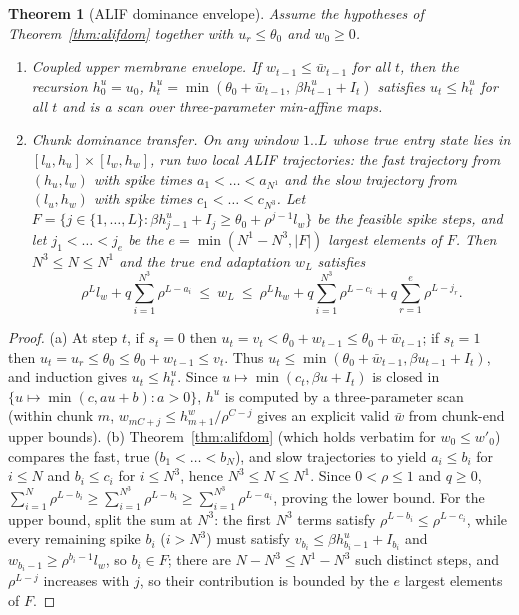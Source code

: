 \documentclass[10pt]{article}
\newtheorem{theorem}{Theorem}
\theoremstyle{remark}
\begin{document}
\begin{theorem}[ALIF dominance envelope]
\label{thm:alifenv}
Assume the hypotheses of Theorem~\ref{thm:alifdom} together with $u_r\le\theta_0$ and $w_0\ge0$.
\begin{enumerate}[label=(\alph*),leftmargin=*]
\item \emph{Coupled upper membrane envelope.} If $w_{t-1}\le \bar w_{t-1}$ for all $t$, then the recursion $h_0^u=u_0$, $h_t^u=\min(\theta_0+\bar w_{t-1},\ \beta h_{t-1}^u+I_t)$ satisfies $u_t\le h_t^u$ for all $t$ and is a scan over three-parameter min-affine maps.
\item \emph{Chunk dominance transfer.} On any window $1..L$ whose true entry state lies in $[l_u,h_u]\times[l_w,h_w]$, run two local ALIF trajectories: the \emph{fast} trajectory from $(h_u,l_w)$ with spike times $a_1<\dots<a_{N^1}$ and the \emph{slow} trajectory from $(l_u,h_w)$ with spike times $c_1<\dots<c_{N^3}$. Let $F=\{j\in\{1,\dots,L\}:\beta h_{j-1}^u+I_j\ge\theta_0+\rho^{j-1}l_w\}$ be the feasible spike steps, and let $j_1<\dots<j_e$ be the $e=\min(N^1-N^3,|F|)$ largest elements of $F$. Then $N^3\le N\le N^1$ and the true end adaptation $w_L$ satisfies
\[\rho^Ll_w+q\sum_{i=1}^{N^3}\rho^{L-a_i}\ \le\ w_L\ \le\ \rho^Lh_w+q\sum_{i=1}^{N^3}\rho^{L-c_i}+q\sum_{r=1}^{e}\rho^{L-j_r}.\]
\end{enumerate}
\end{theorem}
\begin{proof}
(a) At step $t$, if $s_t=0$ then $u_t=v_t<\theta_0+w_{t-1}\le\theta_0+\bar w_{t-1}$; if $s_t=1$ then $u_t=u_r\le\theta_0\le\theta_0+w_{t-1}\le v_t$. Thus $u_t\le\min(\theta_0+\bar w_{t-1},\beta u_{t-1}+I_t)$, and induction gives $u_t\le h_t^u$. Since $u\mapsto\min(c_t,\beta u+I_t)$ is closed in $\{u\mapsto\min(c,au+b):a>0\}$, $h^u$ is computed by a three-parameter scan (within chunk $m$, $w_{mC+j}\le h_{m+1}^w/\rho^{C-j}$ gives an explicit valid $\bar w$ from chunk-end upper bounds).
(b) Theorem~\ref{thm:alifdom} (which holds verbatim for $w_0\le w'_0$) compares the fast, true ($b_1<\dots<b_N$), and slow trajectories to yield $a_i\le b_i$ for $i\le N$ and $b_i\le c_i$ for $i\le N^3$, hence $N^3\le N\le N^1$. Since $0<\rho\le1$ and $q\ge0$, $\sum_{i=1}^N\rho^{L-b_i}\ge\sum_{i=1}^{N^3}\rho^{L-b_i}\ge\sum_{i=1}^{N^3}\rho^{L-a_i}$, proving the lower bound. For the upper bound, split the sum at $N^3$: the first $N^3$ terms satisfy $\rho^{L-b_i}\le\rho^{L-c_i}$, while every remaining spike $b_i$ ($i>N^3$) must satisfy $v_{b_i}\le\beta h_{b_i-1}^u+I_{b_i}$ and $w_{b_i-1}\ge\rho^{b_i-1}l_w$, so $b_i\in F$; there are $N-N^3\le N^1-N^3$ such distinct steps, and $\rho^{L-j}$ increases with $j$, so their contribution is bounded by the $e$ largest elements of $F$.
\end{proof}
\end{document}
